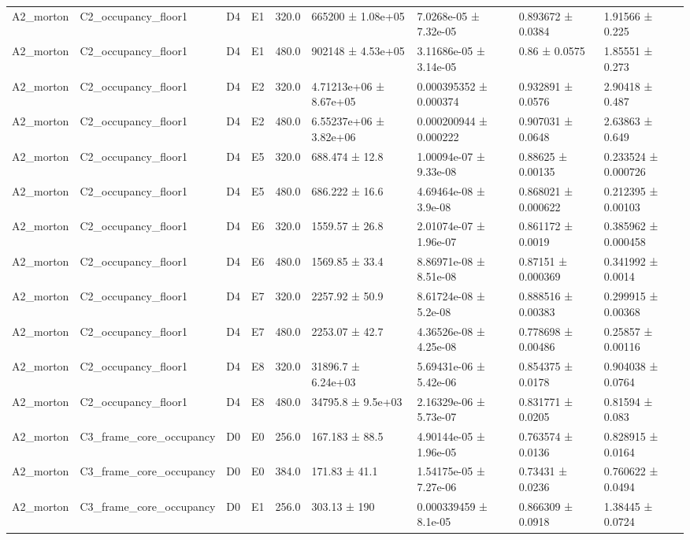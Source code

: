 \begin{table}
\begin{tabular}{lllllllll}
A2\_morton & C2\_occupancy\_floor1 & D4 & E1 & 320.0 & 665200 ± 1.08e+05 & 7.0268e-05 ± 7.32e-05 & 0.893672 ± 0.0384 & 1.91566 ± 0.225 \\
A2\_morton & C2\_occupancy\_floor1 & D4 & E1 & 480.0 & 902148 ± 4.53e+05 & 3.11686e-05 ± 3.14e-05 & 0.86 ± 0.0575 & 1.85551 ± 0.273 \\
A2\_morton & C2\_occupancy\_floor1 & D4 & E2 & 320.0 & 4.71213e+06 ± 8.67e+05 & 0.000395352 ± 0.000374 & 0.932891 ± 0.0576 & 2.90418 ± 0.487 \\
A2\_morton & C2\_occupancy\_floor1 & D4 & E2 & 480.0 & 6.55237e+06 ± 3.82e+06 & 0.000200944 ± 0.000222 & 0.907031 ± 0.0648 & 2.63863 ± 0.649 \\
A2\_morton & C2\_occupancy\_floor1 & D4 & E5 & 320.0 & 688.474 ± 12.8 & 1.00094e-07 ± 9.33e-08 & 0.88625 ± 0.00135 & 0.233524 ± 0.000726 \\
A2\_morton & C2\_occupancy\_floor1 & D4 & E5 & 480.0 & 686.222 ± 16.6 & 4.69464e-08 ± 3.9e-08 & 0.868021 ± 0.000622 & 0.212395 ± 0.00103 \\
A2\_morton & C2\_occupancy\_floor1 & D4 & E6 & 320.0 & 1559.57 ± 26.8 & 2.01074e-07 ± 1.96e-07 & 0.861172 ± 0.0019 & 0.385962 ± 0.000458 \\
A2\_morton & C2\_occupancy\_floor1 & D4 & E6 & 480.0 & 1569.85 ± 33.4 & 8.86971e-08 ± 8.51e-08 & 0.87151 ± 0.000369 & 0.341992 ± 0.0014 \\
A2\_morton & C2\_occupancy\_floor1 & D4 & E7 & 320.0 & 2257.92 ± 50.9 & 8.61724e-08 ± 5.2e-08 & 0.888516 ± 0.00383 & 0.299915 ± 0.00368 \\
A2\_morton & C2\_occupancy\_floor1 & D4 & E7 & 480.0 & 2253.07 ± 42.7 & 4.36526e-08 ± 4.25e-08 & 0.778698 ± 0.00486 & 0.25857 ± 0.00116 \\
A2\_morton & C2\_occupancy\_floor1 & D4 & E8 & 320.0 & 31896.7 ± 6.24e+03 & 5.69431e-06 ± 5.42e-06 & 0.854375 ± 0.0178 & 0.904038 ± 0.0764 \\
A2\_morton & C2\_occupancy\_floor1 & D4 & E8 & 480.0 & 34795.8 ± 9.5e+03 & 2.16329e-06 ± 5.73e-07 & 0.831771 ± 0.0205 & 0.81594 ± 0.083 \\
A2\_morton & C3\_frame\_core\_occupancy & D0 & E0 & 256.0 & 167.183 ± 88.5 & 4.90144e-05 ± 1.96e-05 & 0.763574 ± 0.0136 & 0.828915 ± 0.0164 \\
A2\_morton & C3\_frame\_core\_occupancy & D0 & E0 & 384.0 & 171.83 ± 41.1 & 1.54175e-05 ± 7.27e-06 & 0.73431 ± 0.0236 & 0.760622 ± 0.0494 \\
A2\_morton & C3\_frame\_core\_occupancy & D0 & E1 & 256.0 & 303.13 ± 190 & 0.000339459 ± 8.1e-05 & 0.866309 ± 0.0918 & 1.38445 ± 0.0724 \\

\end{tabular}
\end{table}
